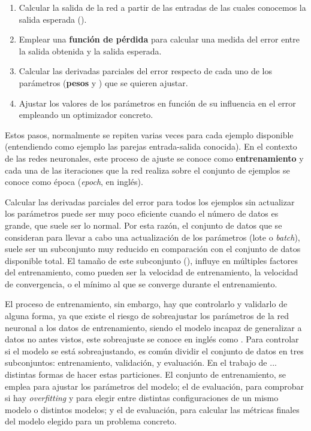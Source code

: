 \begin{enumerate}
\item Calcular la salida de la red a partir de las entradas de las cuales conocemos la salida esperada ().
\item Emplear una \textbf{función de pérdida} para calcular una medida del error entre la salida obtenida y la salida esperada.
\item Calcular las derivadas parciales del error respecto de cada uno de los parámetros (\textbf{pesos} y ) que se quieren ajustar.
\item Ajustar los valores de los parámetros en función de su influencia en el error empleando un optimizador concreto.
\end{enumerate}

Estos pasos, normalmente se repiten varias veces para cada ejemplo disponible (entendiendo como ejemplo las parejas entrada-salida conocida). En el contexto de las redes neuronales, este proceso de ajuste se conoce como \textbf{entrenamiento} y cada una de las iteraciones que la red realiza sobre el conjunto de ejemplos se conoce como época (\textit{epoch}, en inglés). 

Calcular las derivadas parciales del error para todos los ejemplos sin actualizar los parámetros puede ser muy poco eficiente cuando el número de datos es grande, que suele ser lo normal. Por esta razón, el conjunto de datos que se consideran para llevar a cabo una actualización de los parámetros (lote o \textit{batch}), suele ser un subconjunto muy reducido en comparación con el conjunto de datos disponible total. El tamaño de este subconjunto (), influye en múltiples factores \cite{on batch size paper} del entrenamiento, como pueden ser la velocidad de entrenamiento, la velocidad de convergencia, o el mínimo al que se converge durante el entrenamiento.

El proceso de entrenamiento, sin embargo, hay que controlarlo y validarlo de alguna forma, ya que existe el riesgo de sobreajustar los parámetros de la red neuronal a los datos de entrenamiento, siendo el modelo incapaz de generalizar a datos no antes vistos, este sobreajuste se conoce en inglés como . Para controlar si el modelo se está sobreajustando, es común dividir el conjunto de datos en tres subconjuntos: entrenamiento, validación, y evaluación. En el trabajo de ... \cite{El paper ese de 50 páginas con splits} distintas formas de hacer estas particiones. El conjunto de entrenamiento, se emplea para ajustar los parámetros del modelo; el de evaluación, para comprobar si hay \textit{overfitting} y para elegir entre distintas configuraciones de un mismo modelo o distintos modelos; y el de evaluación, para calcular las métricas finales del modelo elegido para un problema concreto.

